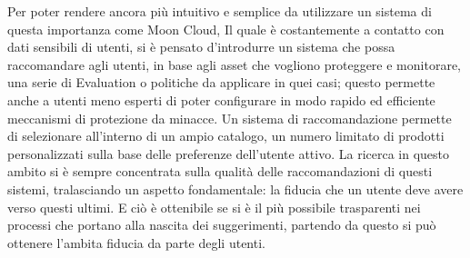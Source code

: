 \documentclass[10pt,a4paper]{article}
\begin{document}
Per poter rendere ancora più intuitivo e semplice da utilizzare un sistema di questa importanza come Moon Cloud, Il quale è costantemente a 
contatto con dati sensibili di utenti, si è pensato d'introdurre un sistema che possa raccomandare agli utenti, in base agli asset che 
vogliono proteggere e monitorare, una serie di Evaluation o politiche da applicare in quei casi; questo permette anche a utenti meno 
esperti di poter configurare in modo rapido ed efficiente meccanismi di protezione da minacce. Un sistema di raccomandazione permette 
di selezionare all’interno di un ampio catalogo, un numero limitato di prodotti personalizzati sulla base delle preferenze dell’utente 
attivo. La ricerca in questo ambito si è sempre concentrata sulla qualità delle raccomandazioni di questi sistemi, tralasciando un 
aspetto fondamentale: la fiducia che un utente deve avere verso questi ultimi. E ciò è ottenibile se si è il più possibile trasparenti 
nei processi che portano alla nascita dei suggerimenti, partendo da questo si può ottenere l'ambita fiducia da parte degli utenti.
\end{document}
